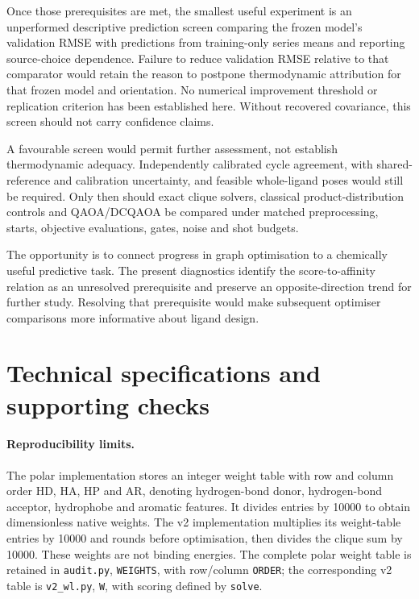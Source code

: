 \documentclass{article}
\begin{document}
Once those prerequisites are met, the smallest useful experiment is an unperformed descriptive prediction screen comparing the frozen model's validation RMSE with predictions from training-only series means and reporting source-choice dependence. Failure to reduce validation RMSE relative to that comparator would retain the reason to postpone thermodynamic attribution for that frozen model and orientation. No numerical improvement threshold or replication criterion has been established here. Without recovered covariance, this screen should not carry confidence claims.

A favourable screen would permit further assessment, not establish thermodynamic adequacy. Independently calibrated cycle agreement, with shared-reference and calibration uncertainty, and feasible whole-ligand poses would still be required. Only then should exact clique solvers, classical product-distribution controls and QAOA/DCQAOA be compared under matched preprocessing, starts, objective evaluations, gates, noise and shot budgets.

The opportunity is to connect progress in graph optimisation to a chemically useful predictive task. The present diagnostics identify the score-to-affinity relation as an unresolved prerequisite and preserve an opposite-direction trend for further study. Resolving that prerequisite would make subsequent optimiser comparisons more informative about ligand design.

\appendix
\section{Technical specifications and supporting checks}

\paragraph{Reproducibility limits.}
The polar implementation stores an integer weight table with row and column order HD, HA, HP and AR, denoting hydrogen-bond donor, hydrogen-bond acceptor, hydrophobe and aromatic features. It divides entries by 10000 to obtain dimensionless native weights. The v2 implementation multiplies its weight-table entries by 10000 and rounds before optimisation, then divides the clique sum by 10000. These weights are not binding energies. The complete polar weight table is retained in \texttt{audit.py}, \texttt{WEIGHTS}, with row/column \texttt{ORDER}; the corresponding v2 table is \texttt{v2\_wl.py}, \texttt{W}, with scoring defined by \texttt{solve}.
\end{document}
